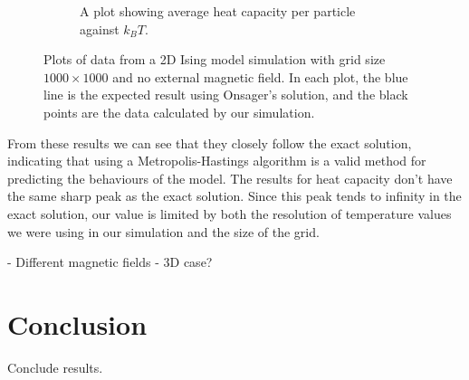 \documentclass[11pt]{article}
\begin{document}
\begin{figure}[H]
\begin{subfigure}{0.45\textwidth}
\begin{center}
			\end{center}
			\caption{A plot showing average heat capacity per particle against $k_BT$.}
		\end{subfigure}
	
		\caption{Plots of data from a 2D Ising model simulation with grid size $1000 \times 1000$ and no external magnetic field. In each plot, the blue line is the expected result using Onsager's solution, and the black points are the data calculated by our simulation.}
		\label{fig:2d_1000_result}
	\end{figure}
	
	From these results we can see that they closely follow the exact solution, indicating that using a Metropolis-Hastings algorithm is a valid method for predicting the behaviours of the model. The results for heat capacity don't have the same sharp peak as the exact solution. Since this peak tends to infinity in the exact solution, our value is limited by both the resolution of temperature values we were using in our simulation and the size of the grid.
	
	- Different magnetic fields
	- 3D case?
	
	\section{Conclusion}
	
	Conclude results.
	
	 
\end{document}
